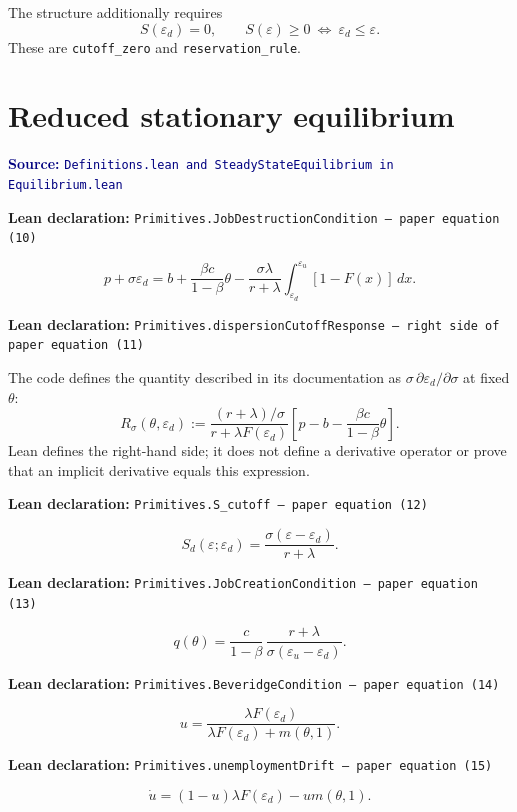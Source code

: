 \documentclass[11pt]{article}
\newcommand{\code}[1]{\texttt{#1}}
\newcommand{\leanfile}[1]{\texttt{#1}}
\newcommand{\epsd}{\varepsilon_d}
\newcommand{\epsu}{\varepsilon_u}
\newcommand{\mworker}[1]{m(#1,1)}
\newcommand{\decl}[1]{\par\smallskip\noindent\colorbox{softblue}{\parbox{0.965\linewidth}{\textbf{Lean declaration:} \code{#1}}}\par\smallskip}
\newcommand{\source}[1]{\textcolor{navy}{\small\textbf{Source:} \leanfile{#1}}}
\begin{document}
The structure additionally requires
\begin{equation*}
S(\epsd)=0,
\qquad
S(\varepsilon)\ge0\ \Longleftrightarrow\ \epsd\le\varepsilon.
\end{equation*}
These are \code{cutoff\_zero} and \code{reservation\_rule}.

\section{Reduced stationary equilibrium}

\source{Definitions.lean and SteadyStateEquilibrium in Equilibrium.lean}

\decl{Primitives.JobDestructionCondition --- paper equation (10)}
\begin{equation}
p+\sigma\epsd
=b+\frac{\beta c}{1-\beta}\theta
-\frac{\sigma\lambda}{r+\lambda}
  \int_{\epsd}^{\epsu}[1-F(x)]\,dx. \tag{10}
\end{equation}

\decl{Primitives.dispersionCutoffResponse --- right side of paper equation (11)}
The code defines the quantity described in its documentation as
$\sigma\,\partial\epsd/\partial\sigma$ at fixed $\theta$:
\begin{equation}
R_\sigma(\theta,\epsd)
:=\frac{(r+\lambda)/\sigma}{r+\lambda F(\epsd)}
\left[p-b-\frac{\beta c}{1-\beta}\theta\right]. \tag{11R}
\end{equation}
Lean defines the right-hand side; it does not define a derivative operator or prove
that an implicit derivative equals this expression.

\decl{Primitives.S\_cutoff --- paper equation (12)}
\begin{equation}
S_d(\varepsilon;\epsd)
=\frac{\sigma(\varepsilon-\epsd)}{r+\lambda}. \tag{12}
\end{equation}

\decl{Primitives.JobCreationCondition --- paper equation (13)}
\begin{equation}
q(\theta)
=\frac{c}{1-\beta}\,
  \frac{r+\lambda}{\sigma(\epsu-\epsd)}. \tag{13}
\end{equation}

\decl{Primitives.BeveridgeCondition --- paper equation (14)}
\begin{equation}
u=\frac{\lambda F(\epsd)}
        {\lambda F(\epsd)+\mworker{\theta}}. \tag{14}
\end{equation}

\decl{Primitives.unemploymentDrift --- paper equation (15)}
\begin{equation}
\dot u=(1-u)\lambda F(\epsd)-u\mworker{\theta}. \tag{15}
\end{equation}
\end{document}
